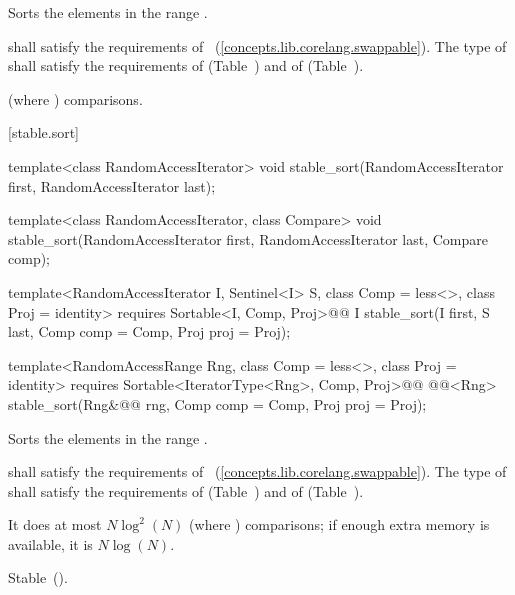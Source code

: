 \begin{itemdescr}
\pnum
\effects
Sorts the elements in the range
.

\begin{removedblock}
\pnum
\requires
{} shall satisfy the requirements of
~(\ref{concepts.lib.corelang.swappable}). The type
of  shall satisfy the requirements of
 (Table~) and of
 (Table~).
\end{removedblock}

\pnum
\complexity
{}
(where
)
comparisons.
\end{itemdescr}

[stable.sort]{}

%
\begin{removedblock}
\begin{itemdecl}
template<class RandomAccessIterator>
  void stable_sort(RandomAccessIterator first, RandomAccessIterator last);

template<class RandomAccessIterator, class Compare>
  void stable_sort(RandomAccessIterator first, RandomAccessIterator last,
                   Compare comp);
\end{itemdecl}
\end{removedblock}
\begin{addedblock}
\begin{itemdecl}
template<RandomAccessIterator I, Sentinel<I> S, class Comp = less<>,
    class Proj = identity>
  requires Sortable<I, Comp, Proj>@\newtxt{()}@
  I stable_sort(I first, S last, Comp comp = Comp{}, Proj proj = Proj{});

template<RandomAccessRange Rng, class Comp = less<>, class Proj = identity>
  requires Sortable<IteratorType<Rng>, Comp, Proj>@\newtxt{()}@
  @@<Rng>
    stable_sort(Rng&@\newtxt{\&}@ rng, Comp comp = Comp{}, Proj proj = Proj{});
\end{itemdecl}
\end{addedblock}

\begin{itemdescr}
\pnum
\effects
Sorts the elements in the range .

\begin{removedblock}
\pnum
\requires
{} shall satisfy the requirements of
~(\ref{concepts.lib.corelang.swappable}). The type
of  shall satisfy the requirements of
 (Table~) and of
 (Table~).
\end{removedblock}

\pnum
\complexity
It does at most $N \log^2(N)$
(where
)
comparisons; if enough extra memory is available, it is
$N \log(N)$.

\pnum
\remarks Stable~().
\end{itemdescr}

